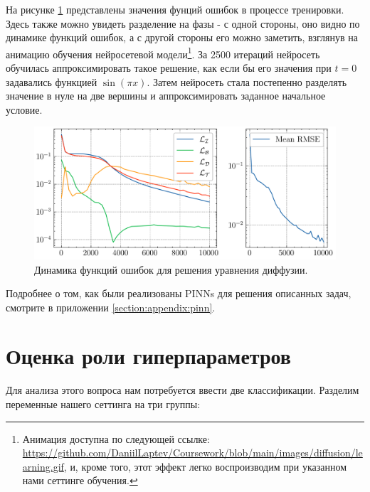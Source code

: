 \documentclass[a4paper, 12pt]{article}
\begin{document}
На рисунке \ref{fig:diffusion:losses} представлены значения фунций ошибок в процессе тренировки. Здесь также можно увидеть разделение на фазы - с одной стороны, оно видно по динамике функций ошибок, а с другой стороны его можно заметить, взглянув на анимацию обучения нейросетевой модели\footnote{Анимация доступна по следующей ссылке: \url{https://github.com/DaniilLaptev/Coursework/blob/main/images/diffusion/learning.gif}, и, кроме того, этот эффект легко воспроизводим при указанном нами сеттинге обучения.}. За 2500 итераций нейросеть обучилась аппроксимировать такое решение, как если бы его значения при $t=0$ задавались функцией $\sin(\pi x)$. Затем нейросеть стала постепенно разделять значение в нуле на две вершины и аппроксимировать заданное начальное условие.

\begin{figure}
    \centering
    \includegraphics{../images/diffusion/Loss report.png}
    \caption{Динамика функций ошибок для решения уравнения диффузии.}
    \label{fig:diffusion:losses}
\end{figure}

Подробнее о том, как были реализованы PINNs для решения описанных задач, смотрите в приложении \ref{section:appendix:pinn}.

\section{Оценка роли гиперпараметров} \label{section:hyperparameters}

Для анализа этого вопроса нам потребуется ввести две классификации. Разделим переменные нашего сеттинга на три группы:
\end{document}
